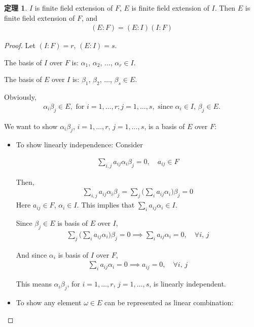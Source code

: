 \documentclass[utf8]{ctexbook}
\theoremstyle{definition}
\newtheorem{prototheorem}{定理}[section]
\newenvironment{theorem}
   {\colorlet{shadecolor}{pink!30}\begin{shaded}\begin{prototheorem}}
   {\end{prototheorem}\end{shaded}}
\begin{document}
\begin{theorem}
\label{theorem_4_3_1_finite_extension_transitivity}
$I$ is finite field extension of $F$, $E$ is finite field extension of $I$. Then $E$ is finite field extension of $F$, and
\begin{align*}
(E:F) = (E: I) (I:F)
\end{align*}
\end{theorem}

\begin{proof}
Let $(I:F) = r$, $(E: I) = s$.

The basis of $I$ over $F$ is: $\alpha_1$, $\alpha_2$, $\ldots$, $\alpha_r \in I$.

The basis of $E$ over $I$ is: $\beta_1$, $\beta_2$, $\ldots$, $\beta_s \in E$.

Obviously,
\begin{align*}
\alpha_i \beta_j \in E, \mbox{ for } i = 1, \ldots, r; j = 1, \ldots, s, \mbox{ since } \alpha_i \in I, \, \beta_j \in E .
\end{align*} 

We want to show $\alpha_i \beta_j$, $i = 1, \ldots, r$, $j = 1, \ldots, s $, is a basis of $E$ over $F$:
\begin{itemize}
\item{To show linearly independence:
Consider

\begin{align*}
\sum_{i,j} a_{ij} \alpha_i \beta_j = 0, \quad a_{ij} \in F
\end{align*}

Then,
\begin{align*}
\sum_{i,j} a_{ij} \alpha_i \beta_j = \sum_j \bigg( \sum_i a_{ij} \alpha_i \bigg) \beta_j = 0
\end{align*}
Here $a_{ij} \in F$, $\alpha_i \in I$. This implies that $\sum_i a_{ij} \alpha_i \in I $.

Since $\beta_j \in E$ is basis of $E$ over $I$, 
\begin{align*}
\sum_j \bigg( \sum_i a_{ij} \alpha_i \bigg) \beta_j = 0 \implies \sum_i a_{ij} \alpha_i = 0, \quad \forall i,\, j
\end{align*}

And since $\alpha_i$ is basis of $I$ over $F$,
\begin{align*}
\sum_i a_{ij} \alpha_i = 0 \implies a_{ij} = 0, \quad \forall i,\, j
\end{align*}

This means $\alpha_i \beta_j$, for $i= 1, \ldots, r$, $j = 1, \ldots, s$, is linearly independent.
}
\item{To show any element $\omega \in E$ can be represented as linear combination:

}
\end{itemize}
\end{proof}
\end{document}
